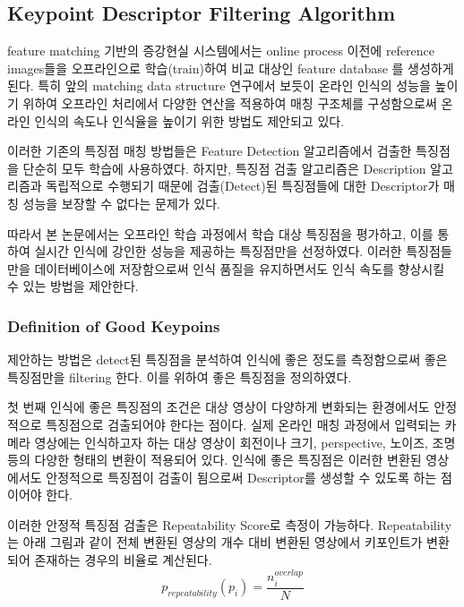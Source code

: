 

\subsection{Keypoint Descriptor Filtering Algorithm}

feature matching 기반의 증강현실 시스템에서는 online process 이전에 reference images들을 오프라인으로 학습(train)하여 비교 대상인 feature database 를 생성하게 된다. 특히 앞의 matching data structure 연구에서 보듯이 온라인 인식의 성능을 높이기 위하여 오프라인 처리에서 다양한 연산을 적용하여 매칭 구조체를 구성함으로써 온라인 인식의 속도나 인식율을 높이기 위한 방법도 제안되고 있다. 

이러한 기존의 특징점 매칭 방법들은 Feature Detection 알고리즘에서 검출한 특징점을 단순히 모두 학습에 사용하였다. 하지만, 특징점 검출 알고리즘은 Description 알고리즘과 독립적으로 수행되기 때문에 검출(Detect)된 특징점들에 대한 Descriptor가 매칭 성능을 보장할 수 없다는 문제가 있다. 

따라서 본 논문에서는 오프라인 학습 과정에서 학습 대상 특징점을 평가하고, 이를 통하여 실시간 인식에 강인한 성능을 제공하는 특징점만을 선정하였다. 이러한 특징점들만을 데이터베이스에 저장함으로써 인식 품질을 유지하면서도 인식 속도를 향상시킬 수 있는 방법을 제안한다.

\subsubsection{Definition of Good Keypoins}

제안하는 방법은 detect된 특징점을 분석하여 인식에 좋은 정도를 측정함으로써 좋은 특징점만을 filtering 한다. 이를 위하여 좋은 특징점을 정의하였다.

첫 번째 인식에 좋은 특징점의 조건은 대상 영상이 다양하게 변화되는 환경에서도 안정적으로 특징점으로 검출되어야 한다는 점이다. 실제 온라인 매칭 과정에서 입력되는 카메라 영상에는 인식하고자 하는 대상 영상이 회전이나 크기, perspective, 노이즈, 조명 등의 다양한 형태의 변환이 적용되어 있다. 인식에 좋은 특징점은 이러한 변환된 영상에서도 안정적으로 특징점이 검출이 됨으로써 Descriptor를 생성할 수 있도록 하는 점이어야 한다.

이러한 안정적 특징점 검출은 Repeatability Score로 측정이 가능하다. Repeatability는 아래 그림과 같이 전체 변환된 영상의 개수 대비 변환된 영상에서 키포인트가 변환되어 존재하는 경우의 비율로 계산된다.
\begin{equation}
p_{repeatability}(p_i) = \frac{n_i^{overlap}}{N}
\end{equation}

